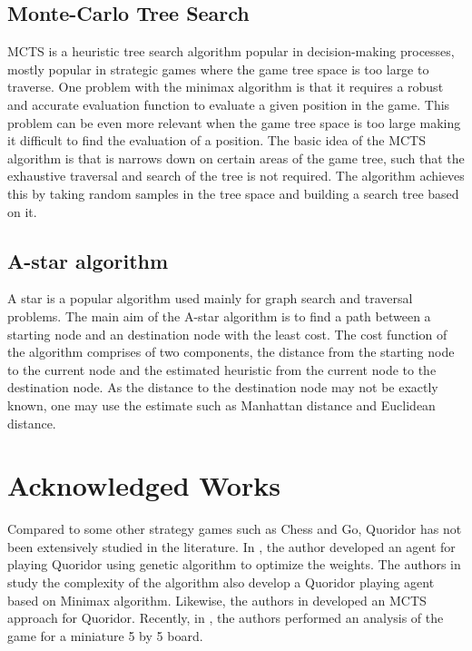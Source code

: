 \subsection{Monte-Carlo Tree Search}
\gls{MCTS} \citep{Coulom2006Efficient} is a heuristic tree search algorithm popular in decision-making processes, mostly popular in strategic games where the game tree space is too large to traverse. One problem with the minimax algorithm is that it requires a robust and accurate evaluation function to evaluate a given position in the game. This problem can be even more relevant when the game tree space is too large making it difficult to find the evaluation of a position. The basic idea of the \gls{MCTS} algorithm is that is narrows down on certain areas of the game tree, such that the exhaustive traversal and search of the tree is not required. The algorithm achieves this by taking random samples in the tree space and building a search tree based on it.

\subsection{A-star algorithm}
A star is a popular algorithm \citep{Hart1968AFormal} used mainly for graph search and traversal problems. The main aim of the A-star algorithm is to find a path between a starting node and an destination node with the least cost. The cost function of the algorithm comprises of two components, the distance from the starting node to the current node and the estimated heuristic from the current node to the destination node. As the distance to the destination node may not be exactly known, one may use the estimate such as Manhattan distance and Euclidean distance.


\section {Acknowledged Works}

Compared to some other strategy games such as Chess and Go, Quoridor has not been extensively studied in the literature. In \citep{Glendenning2002MasteringQ}, the author developed an agent for playing Quoridor using genetic algorithm to optimize the weights. The authors in \citep{Mertens2006Quoridor} study the complexity of the algorithm also develop a Quoridor playing agent based on Minimax algorithm. Likewise, the authors in \citep{Brenner2015Artificial} developed an \gls{MCTS} approach for Quoridor. Recently, in \citep{Iwanaga2022Analysis}, the authors performed an analysis of the game for a miniature 5 by 5 board.

